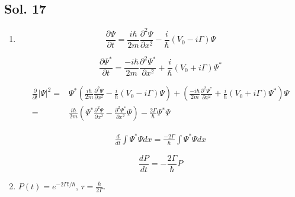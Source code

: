 \subsection*{Sol. 17}
\begin{enumerate}
    \item 
    $$
    \frac{\partial \Psi}{\partial t}
    =\frac{i\hbar}{2m}\frac{\partial^2\Psi}{\partial x^2} - 
    \frac{i}{\hbar}(V_0-i\Gamma)\Psi
    $$

    $$
    \frac{\partial \Psi^*}{\partial t}
    =\frac{-i\hbar}{2m}\frac{\partial^2\Psi^*}{\partial x^2} + 
    \frac{i}{\hbar}(V_0+i\Gamma)\Psi^*
    $$

    \begin{align*}
        \frac{\partial}{\partial t}|\Psi|^2
        =&\Psi^*(\frac{i\hbar}{2m}\frac{\partial^2\Psi}{\partial x^2} - 
    \frac{i}{\hbar}(V_0-i\Gamma)\Psi) + 
    (\frac{-i\hbar}{2m}\frac{\partial^2\Psi^*}{\partial x^2} + 
    \frac{i}{\hbar}(V_0+i\Gamma)\Psi^*)\Psi\\
    =&
    \frac{i\hbar}{2m}(
    \Psi^*
    \frac{\partial^2\Psi}{\partial x^2}
    - 
    \frac{\partial^2\Psi^*}{\partial x^2}\Psi
    ) -\frac{2\Gamma}{\hbar}\Psi^*\Psi
    \end{align*}

    \begin{align*}
        \frac{d}{dt}\int\Psi^*\Psi dx
        =\frac{-2\Gamma}{\hbar}
        \int\Psi^*\Psi dx
    \end{align*}

    $$
    \frac{dP}{dt} = -\frac{2\Gamma}{\hbar}P
    $$

    \item $P(t) = e^{-2\Gamma t/\hbar}$, $\tau = \frac{\hbar}{2\Gamma}$.
    
\end{enumerate}

